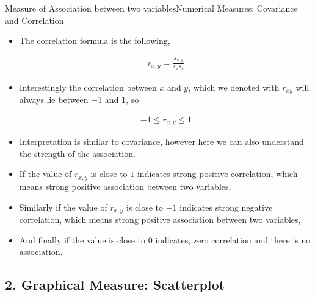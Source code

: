 \documentclass[8pt, usepdftitle=false]{beamer}
\begin{document}
\begin{frame}[allowframebreaks]{Measure of Association between two variables}{Numerical Measures: Covariance and Correlation}
\begin{itemize}
\begin{align*}
s_{x, y} & =\frac{\sum\left(x_i-\bar{x}\right)\left(y_i-\bar{y}\right)}{n-1} \\
s_x & =\sqrt{\frac{\sum\left(x_i-\bar{x}\right)^2}{n-1}} \\
s_y & =\sqrt{\frac{\sum\left(y_i-\bar{y}\right)^2}{n-1}}
\end{align*}


\item The correlation formula is the following,

\begin{align*}
  r_{x, y}=\frac{s_{x , y}}{s_x s_y}
\end{align*}


\item Interestingly the correlation between $x$ and $y$, which we denoted with $r_{x y}$ will always lie between $-1$ and $1$, so 

\begin{align*}
  -1 \leq r_{x, y} \leq 1
\end{align*}

\item Interpretation is similar to covariance, however here we can also understand the strength of the association. 

\item If the value of $r_{x, y}$ is \alert{close to $1$ indicates strong positive correlation}, which means strong positive association between two variables, 

\item Similarly  if the value of $r_{x, y}$ is \alert{close to $-1$ indicates strong negative correlation}, which means strong positive association between two variables, 

\item And finally if the value is close to $0$ indicates, zero correlation and there is no association.


\end{itemize}


\end{frame}


\subsection{2. Graphical Measure: Scatterplot}
\frame{\subsectionpage}
\end{document}
